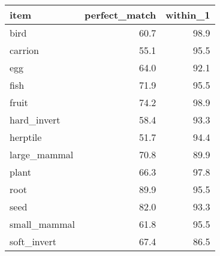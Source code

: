 \begin{table}
\centering
\begin{tabular}[t]{l|r|r}
\hline
item & perfect\_match & within\_1\\
\hline
bird & 60.7 & 98.9\\
\hline
carrion & 55.1 & 95.5\\
\hline
egg & 64.0 & 92.1\\
\hline
fish & 71.9 & 95.5\\
\hline
fruit & 74.2 & 98.9\\
\hline
hard\_invert & 58.4 & 93.3\\
\hline
herptile & 51.7 & 94.4\\
\hline
large\_mammal & 70.8 & 89.9\\
\hline
plant & 66.3 & 97.8\\
\hline
root & 89.9 & 95.5\\
\hline
seed & 82.0 & 93.3\\
\hline
small\_mammal & 61.8 & 95.5\\
\hline
soft\_invert & 67.4 & 86.5\\
\hline
\end{tabular}
\end{table}
